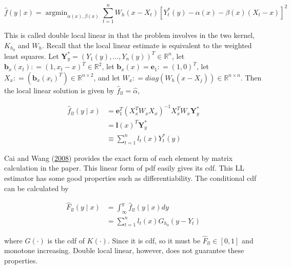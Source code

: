 \documentclass[
]{article}
\theoremstyle{definition}
\theoremstyle{definition}
\theoremstyle{definition}
\theoremstyle{remark}
\begin{document}
\begin{equation}
  \hat{f}(y \mid x) = \mathop{\mathrm{argmin}}_{\alpha(x), \beta(x)} \sum_{t = 1}^n W_h (x - X_t) \left[ Y_t^{\ast}(y) - \alpha(x) - \beta(x) (X_t - x) \right]^2
  \label{eq:doublell}
\end{equation}

This is called double local linear in that the problem involves in the two kernel, \(K_{h_0}\) and \(W_h\). Recall that the local linear estimate is equivalent to the weighted least squares. Let \(\mathbf{Y}_y^{\ast} = \left( Y_1(y), \ldots, Y_n(y) \right)^T \in \mathbb{R}^n\), let \(\mathbf{b}_x(x_t) \mathpunct{:}=(1, x_t - x)^T \in \mathbb{R}^2\), let \(\mathbf{b}_x(x) = \mathbf{e}_1 \mathpunct{:}=(1, 0)^T\), let \(X_x \mathpunct{:}=\left( \mathbf{b}_x(x_i)^T \right) \in \mathbb{R}^{n \times 2}\), and let \(W_x \mathpunct{:}=diag(W_h(x - X_j)) \in \mathbb{R}^{n \times n}\). Then the local linear solution is given by \(\hat{f}_{ll} = \hat\alpha\),

\begin{equation}
  \begin{split}
    \hat{f}_{ll}(y \mid x) & = \mathbf{e}_1^T (X_x^T W_x X_x)^{-1} X_x^T W_x \mathbf{Y}_y^{\ast} \\
    & = \mathbf{l}(x)^T \mathbf{Y}_y^{\ast} \\
    & \equiv \sum_{t = 1}^n l_t(x) Y_t^{\ast}(y)
  \end{split}
  \label{eq:llsolution}
\end{equation}

Cai and Wang (\protect\hyperlink{ref-cai:2008aa}{2008}) provides the exact form of each element by matrix calculation in the paper. This linear form of pdf easily gives its cdf. This LL estimator has some good properties such as differentiability. The conditional cdf can be calculated by

\begin{equation}
  \begin{split}
    \hat{F}_{ll}(y \mid x) & = \int_\infty^y \hat{f}_{ll}(y \mid x) dy \\
    & = \sum_{t = 1}^n l_t(x) G_{h_0}(y - Y_t)
  \end{split}
  \label{eq:llcdf}
\end{equation}

where \(G(\cdot)\) is the cdf of \(K(\cdot)\). Since it is cdf, so it must be \(\hat{F}_{ll} \in [0, 1]\) and monotone increasing. Double local linear, however, does not guarantee these properties.
\end{document}
